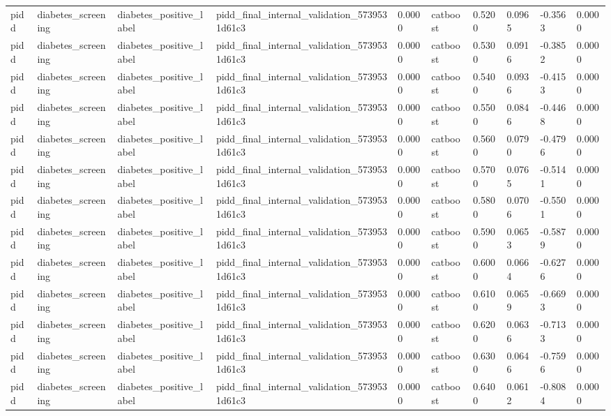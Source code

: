 \begin{tabular}{llllllllll}
pidd & diabetes\_screening & diabetes\_positive\_label & pidd\_final\_internal\_validation\_5739531d61c3 & 0.0000 & catboost & 0.5200 & 0.0965 & -0.3563 & 0.0000 \\
pidd & diabetes\_screening & diabetes\_positive\_label & pidd\_final\_internal\_validation\_5739531d61c3 & 0.0000 & catboost & 0.5300 & 0.0916 & -0.3852 & 0.0000 \\
pidd & diabetes\_screening & diabetes\_positive\_label & pidd\_final\_internal\_validation\_5739531d61c3 & 0.0000 & catboost & 0.5400 & 0.0936 & -0.4153 & 0.0000 \\
pidd & diabetes\_screening & diabetes\_positive\_label & pidd\_final\_internal\_validation\_5739531d61c3 & 0.0000 & catboost & 0.5500 & 0.0846 & -0.4468 & 0.0000 \\
pidd & diabetes\_screening & diabetes\_positive\_label & pidd\_final\_internal\_validation\_5739531d61c3 & 0.0000 & catboost & 0.5600 & 0.0790 & -0.4796 & 0.0000 \\
pidd & diabetes\_screening & diabetes\_positive\_label & pidd\_final\_internal\_validation\_5739531d61c3 & 0.0000 & catboost & 0.5700 & 0.0765 & -0.5141 & 0.0000 \\
pidd & diabetes\_screening & diabetes\_positive\_label & pidd\_final\_internal\_validation\_5739531d61c3 & 0.0000 & catboost & 0.5800 & 0.0706 & -0.5501 & 0.0000 \\
pidd & diabetes\_screening & diabetes\_positive\_label & pidd\_final\_internal\_validation\_5739531d61c3 & 0.0000 & catboost & 0.5900 & 0.0653 & -0.5879 & 0.0000 \\
pidd & diabetes\_screening & diabetes\_positive\_label & pidd\_final\_internal\_validation\_5739531d61c3 & 0.0000 & catboost & 0.6000 & 0.0664 & -0.6276 & 0.0000 \\
pidd & diabetes\_screening & diabetes\_positive\_label & pidd\_final\_internal\_validation\_5739531d61c3 & 0.0000 & catboost & 0.6100 & 0.0659 & -0.6693 & 0.0000 \\
pidd & diabetes\_screening & diabetes\_positive\_label & pidd\_final\_internal\_validation\_5739531d61c3 & 0.0000 & catboost & 0.6200 & 0.0636 & -0.7133 & 0.0000 \\
pidd & diabetes\_screening & diabetes\_positive\_label & pidd\_final\_internal\_validation\_5739531d61c3 & 0.0000 & catboost & 0.6300 & 0.0646 & -0.7596 & 0.0000 \\
pidd & diabetes\_screening & diabetes\_positive\_label & pidd\_final\_internal\_validation\_5739531d61c3 & 0.0000 & catboost & 0.6400 & 0.0612 & -0.8084 & 0.0000 \\

\end{tabular}
